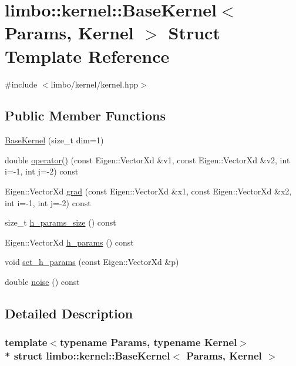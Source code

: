 \hypertarget{structlimbo_1_1kernel_1_1_base_kernel}{}\section{limbo\+:\+:kernel\+:\+:Base\+Kernel$<$ Params, Kernel $>$ Struct Template Reference}
\label{structlimbo_1_1kernel_1_1_base_kernel}


{\ttfamily \#include $<$limbo/kernel/kernel.\+hpp$>$}

\subsection*{Public Member Functions}
\begin{DoxyCompactItemize}
\item 
\hyperlink{structlimbo_1_1kernel_1_1_base_kernel_aa147d007671f11249dd2126325107fb3}{Base\+Kernel} (size\+\_\+t dim=1)
\item 
double \hyperlink{structlimbo_1_1kernel_1_1_base_kernel_ab9a0aba134c22cb8c6b25571e648b9bf}{operator()} (const Eigen\+::\+Vector\+Xd \&v1, const Eigen\+::\+Vector\+Xd \&v2, int i=-\/1, int j=-\/2) const 
\item 
Eigen\+::\+Vector\+Xd \hyperlink{structlimbo_1_1kernel_1_1_base_kernel_a99e4fde45a031017e9916bdd8d662b8c}{grad} (const Eigen\+::\+Vector\+Xd \&x1, const Eigen\+::\+Vector\+Xd \&x2, int i=-\/1, int j=-\/2) const 
\item 
size\+\_\+t \hyperlink{structlimbo_1_1kernel_1_1_base_kernel_a1ffc58d9493a13ec3685c2bb4f8d997e}{h\+\_\+params\+\_\+size} () const 
\item 
Eigen\+::\+Vector\+Xd \hyperlink{structlimbo_1_1kernel_1_1_base_kernel_a5547c4409191381d10dc034f26d5d2ba}{h\+\_\+params} () const 
\item 
void \hyperlink{structlimbo_1_1kernel_1_1_base_kernel_a520f7aaa4d1de0391f85fd3fb36291e6}{set\+\_\+h\+\_\+params} (const Eigen\+::\+Vector\+Xd \&p)
\item 
double \hyperlink{structlimbo_1_1kernel_1_1_base_kernel_ad75f586e3a358b6b09dbd054bb4e3c9c}{noise} () const 
\end{DoxyCompactItemize}


\subsection{Detailed Description}
\subsubsection*{template$<$typename Params, typename Kernel$>$\\*
struct limbo\+::kernel\+::\+Base\+Kernel$<$ Params, Kernel $>$}

